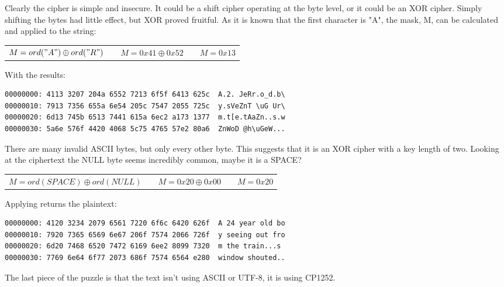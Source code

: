 \documentclass{article}
\begin{document}
\clearpage

Clearly the cipher is simple and insecure. It could be a shift cipher operating at the byte level, or it could be an XOR cipher. Simply shifting the bytes had little effect, but XOR proved fruitful. As it is known that the first character is "A", the mask, M, can be calculated and applied to the string:

\begin{table}[H]
\centering
\begin{tabular}{ccccc}
$M = ord("A") \oplus ord("R")$ & & $M = 0x41 \oplus 0x52$ & & $M = 0x13$\\
\end{tabular}
\end{table}

With the results:

\begin{lstlisting}[frame=single]
00000000: 4113 3207 204a 6552 7213 6f5f 6413 625c  A.2. JeRr.o_d.b\
00000010: 7913 7356 655a 6e54 205c 7547 2055 725c  y.sVeZnT \uG Ur\
00000020: 6d13 745b 6513 7441 615a 6ec2 a173 1377  m.t[e.tAaZn..s.w
00000030: 5a6e 576f 4420 4068 5c75 4765 57e2 80a6  ZnWoD @h\uGeW...
\end{lstlisting}

There are many invalid ASCII bytes, but only every other byte. This suggests that it is an XOR cipher with a key length of two. Looking at the ciphertext the NULL byte seems incredibly common, maybe it is a SPACE?

\begin{table}[H]
\centering
\begin{tabular}{ccccc}
$M = ord(SPACE) \oplus ord(NULL)$ & & $M = 0x20 \oplus 0x00$ & & $M = 0x20$\\
\end{tabular}
\end{table}

Applying returns the plaintext:

\begin{lstlisting}[frame=single]
00000000: 4120 3234 2079 6561 7220 6f6c 6420 626f  A 24 year old bo
00000010: 7920 7365 6569 6e67 206f 7574 2066 726f  y seeing out fro
00000020: 6d20 7468 6520 7472 6169 6ee2 8099 7320  m the train...s
00000030: 7769 6e64 6f77 2073 686f 7574 6564 e280  window shouted..
\end{lstlisting}

The last piece of the puzzle is that the text isn't using ASCII or UTF-8, it is using CP1252.

\clearpage
\end{document}

